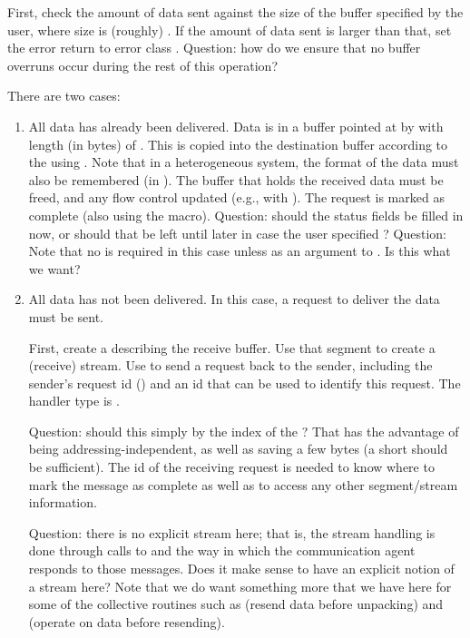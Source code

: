 \begin{mmadi}
\begin{tcp}
\begin{enumerate}
First, check the amount of data sent against the size of the buffer specified
by the user, where size is (roughly) .  If the
amount of data sent is larger than that, set the error return to error class
.   
Question: how do we ensure that no buffer overruns occur during the rest of
this operation?

There are two cases:
\begin{enumerate}
\item All data has already been delivered.  
Data is in a buffer pointed at by  with length
(in bytes) of .  This is copied into the
destination buffer according to the  using
.  Note that in a heterogeneous system, the format of the
data must also be remembered (in ).
The buffer that holds the received data must be freed, and any flow control
updated (e.g., with ).  The request is marked as
complete (also using the  macro).
Question: should the status fields be filled in now, or should that be left
until later in case the user specified ?
Question:  Note that no  is required in this case
unless as an argument to .  Is this what we want?

\item All data has not been delivered.  In this case, a request to deliver the
  data must be sent.  
  
  First, create a  describing the receive buffer.
  Use that segment to create a (receive) stream.
  Use  to send a request back to the
  sender, including the sender's request id
  () and an id that can be used to
  identify this request.  The handler type is .

  Question: should this simply by the index of the ?
  That has the advantage of being addressing-independent, as well as saving a
  few bytes (a short should be sufficient).  The id of the receiving request
  is needed to know where to mark the message as complete as well as to access
  any other segment/stream information.

  Question: there is no explicit stream here; that is, the stream handling is
  done through calls to  and the way in which the
  communication agent responds to those messages.  Does it make sense to have
  an explicit notion of a stream here?  Note that we do want something more
  that we have here for some of the collective routines such as
   (resend data before unpacking) and
   (operate on data before resending).


\end{enumerate}
\end{enumerate}
\end{tcp}
\end{mmadi}
